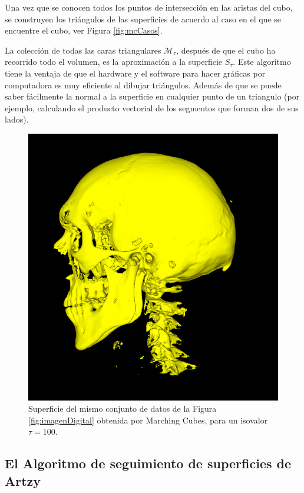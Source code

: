 Una vez que se conocen todos los puntos de intersección en las aristas del cubo, se construyen los triángulos de las superficies de acuerdo al caso en el que se encuentre el cubo, ver Figura \ref{fig:mcCasos}. 

La colección de todas las caras triangulares $\mathcal{M}_{\tau}$, después de que el cubo ha recorrido todo el volumen, es la aproximación a la superficie $S_{\tau}$. Este algoritmo tiene la ventaja de que el hardware y el software para hacer gráficas por computadora es muy eficiente al dibujar triángulos. Además de que se puede saber fácilmente la normal a la superficie en cualquier punto de un triangulo (por ejemplo, calculando el producto vectorial de los segmentos que forman dos de sus lados).

\begin{figure}[htp]
 \centering
  \includegraphics[scale=.45]{img/cap01/mc100}
  \caption[Ejemplo de superficie obtenida por Marching Cubes]{Superficie del mismo conjunto de datos de la Figura \ref{fig:imagenDigital} obtenida por Marching Cubes, para un isovalor $\tau = 100$.}
  \label{fig:ejmploMC}
\end{figure}

\subsection{El Algoritmo de seguimiento de superficies de Artzy}

